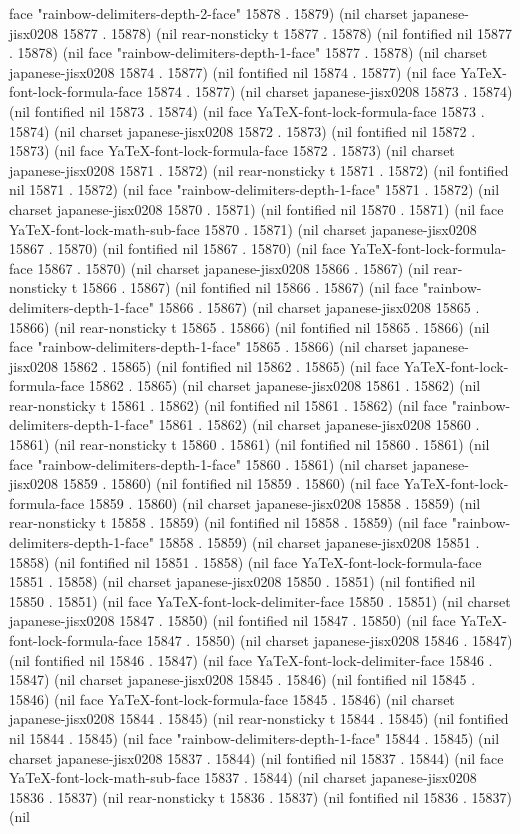 face "rainbow-delimiters-depth-2-face" 15878 . 15879) (nil charset japanese-jisx0208 15877 . 15878) (nil rear-nonsticky t 15877 . 15878) (nil fontified nil 15877 . 15878) (nil face "rainbow-delimiters-depth-1-face" 15877 . 15878) (nil charset japanese-jisx0208 15874 . 15877) (nil fontified nil 15874 . 15877) (nil face YaTeX-font-lock-formula-face 15874 . 15877) (nil charset japanese-jisx0208 15873 . 15874) (nil fontified nil 15873 . 15874) (nil face YaTeX-font-lock-formula-face 15873 . 15874) (nil charset japanese-jisx0208 15872 . 15873) (nil fontified nil 15872 . 15873) (nil face YaTeX-font-lock-formula-face 15872 . 15873) (nil charset japanese-jisx0208 15871 . 15872) (nil rear-nonsticky t 15871 . 15872) (nil fontified nil 15871 . 15872) (nil face "rainbow-delimiters-depth-1-face" 15871 . 15872) (nil charset japanese-jisx0208 15870 . 15871) (nil fontified nil 15870 . 15871) (nil face YaTeX-font-lock-math-sub-face 15870 . 15871) (nil charset japanese-jisx0208 15867 . 15870) (nil fontified nil 15867 . 15870) (nil face YaTeX-font-lock-formula-face 15867 . 15870) (nil charset japanese-jisx0208 15866 . 15867) (nil rear-nonsticky t 15866 . 15867) (nil fontified nil 15866 . 15867) (nil face "rainbow-delimiters-depth-1-face" 15866 . 15867) (nil charset japanese-jisx0208 15865 . 15866) (nil rear-nonsticky t 15865 . 15866) (nil fontified nil 15865 . 15866) (nil face "rainbow-delimiters-depth-1-face" 15865 . 15866) (nil charset japanese-jisx0208 15862 . 15865) (nil fontified nil 15862 . 15865) (nil face YaTeX-font-lock-formula-face 15862 . 15865) (nil charset japanese-jisx0208 15861 . 15862) (nil rear-nonsticky t 15861 . 15862) (nil fontified nil 15861 . 15862) (nil face "rainbow-delimiters-depth-1-face" 15861 . 15862) (nil charset japanese-jisx0208 15860 . 15861) (nil rear-nonsticky t 15860 . 15861) (nil fontified nil 15860 . 15861) (nil face "rainbow-delimiters-depth-1-face" 15860 . 15861) (nil charset japanese-jisx0208 15859 . 15860) (nil fontified nil 15859 . 15860) (nil face YaTeX-font-lock-formula-face 15859 . 15860) (nil charset japanese-jisx0208 15858 . 15859) (nil rear-nonsticky t 15858 . 15859) (nil fontified nil 15858 . 15859) (nil face "rainbow-delimiters-depth-1-face" 15858 . 15859) (nil charset japanese-jisx0208 15851 . 15858) (nil fontified nil 15851 . 15858) (nil face YaTeX-font-lock-formula-face 15851 . 15858) (nil charset japanese-jisx0208 15850 . 15851) (nil fontified nil 15850 . 15851) (nil face YaTeX-font-lock-delimiter-face 15850 . 15851) (nil charset japanese-jisx0208 15847 . 15850) (nil fontified nil 15847 . 15850) (nil face YaTeX-font-lock-formula-face 15847 . 15850) (nil charset japanese-jisx0208 15846 . 15847) (nil fontified nil 15846 . 15847) (nil face YaTeX-font-lock-delimiter-face 15846 . 15847) (nil charset japanese-jisx0208 15845 . 15846) (nil fontified nil 15845 . 15846) (nil face YaTeX-font-lock-formula-face 15845 . 15846) (nil charset japanese-jisx0208 15844 . 15845) (nil rear-nonsticky t 15844 . 15845) (nil fontified nil 15844 . 15845) (nil face "rainbow-delimiters-depth-1-face" 15844 . 15845) (nil charset japanese-jisx0208 15837 . 15844) (nil fontified nil 15837 . 15844) (nil face YaTeX-font-lock-math-sub-face 15837 . 15844) (nil charset japanese-jisx0208 15836 . 15837) (nil rear-nonsticky t 15836 . 15837) (nil fontified nil 15836 . 15837) (nil 